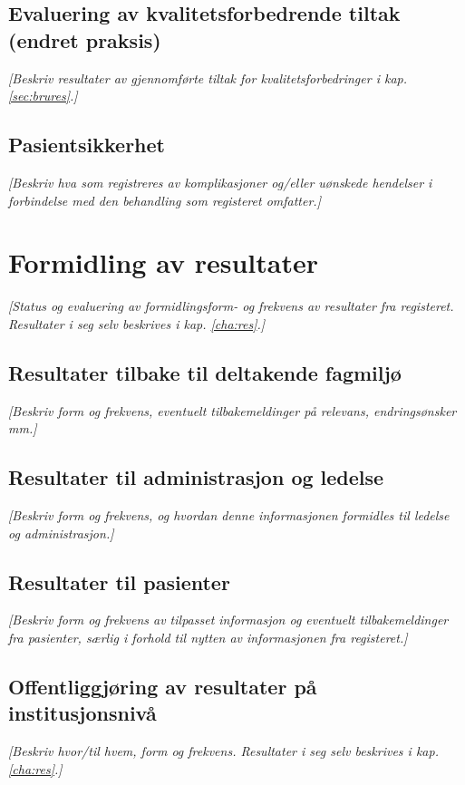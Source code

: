 \documentclass[norsk, a4paper, twocolumn]{report}
\newcommand{\guide}[1] {
	\textit{[\textcolor{guidegray}{#1}]}
	}
\begin{document}
\section{Evaluering av kvalitetsforbedrende tiltak (endret praksis)}\label{sec:evakva}
\guide{Beskriv resultater av gjennomførte tiltak for kvalitetsforbedringer
i kap. \ref{sec:brures}.}

\section{Pasientsikkerhet}\label{sec:kom}
\guide{Beskriv hva som registreres av komplikasjoner og/eller uønskede
hendelser i forbindelse med den behandling som registeret omfatter.}




\chapter{Formidling av resultater}\label{cha:dat}
\guide{Status og evaluering av formidlingsform- og frekvens
av resultater fra registeret. Resultater i seg selv beskrives i kap.
\ref{cha:res}.}


\section{Resultater tilbake til deltakende fagmiljø}\label{sec:resfag}
\guide{Beskriv form og frekvens,  eventuelt tilbakemeldinger på relevans,
endringsønsker mm.}

\section{Resultater til administrasjon og ledelse}\label{sec:resled}
\guide{Beskriv form og frekvens, og hvordan denne
informasjonen formidles til ledelse og administrasjon.}

\section{Resultater til pasienter}\label{sec:respas}
\guide{Beskriv form og frekvens av tilpasset informasjon og eventuelt
tilbakemeldinger fra pasienter, særlig i forhold til nytten av informasjonen
fra registeret.}

\section{Offentliggjøring av resultater på institusjonsnivå}\label{sec:off}
\guide{Beskriv hvor/til hvem, form og frekvens. Resultater i seg selv beskrives i kap. \ref{cha:res}.}
\end{document}
